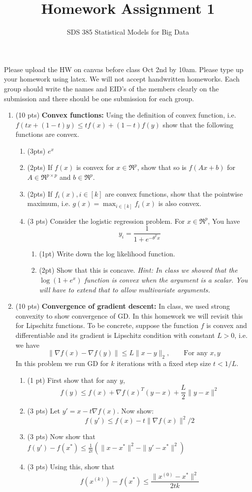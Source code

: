 \documentclass[11pt]{article}
\newcommand{\bi}{\begin{enumerate}}
\newcommand{\ib}{\end{enumerate}}
\newcommand{\p}{\item}
\begin{document}
\title{{\bf Homework Assignment 1}}
\author{SDS 385 Statistical Models for Big Data}

\date{}

\maketitle{}
Please upload the HW on canvas before class Oct 2nd by 10am. Please type up your homework using latex. We will not accept handwritten homeworks. Each group should write the names and EID's of the members clearly on the submission and there should be one submission for each group. 
\begin{enumerate}%
\item (10 pts) \textbf{Convex functions: } Using the definition of convex function, i.e. $f(tx+(1-t)y)\leq tf(x)+(1-t)f(y)$ show that the following functions are convex.
\bi
\p (3pts) $e^x$
\p (2pts) If $f(x)$ is convex for $x\in\Re^p$, show that so is $f(Ax+b)$ for $A\in \Re^{p\times p}$ and $b\in \Re^p$.
\p (2pts) If $f_i(x),i\in[k]$ are convex functions, show that the pointwise maximum, i.e. $g(x)=\max_{i\in[k]}f_i(x)$ is also convex.
\p (3 pts) Consider the logistic regression problem. For $x\in \Re^p$, You have
$$y_i=\frac{1}{1+e^{-\theta^T x}}$$

\bi
\p (1pt) Write down the log likelihood function.
\p (2pt) Show that this is concave.
\textit{Hint: In class we showed that the $\log(1+e^x)$ function is convex when the argument is a scalar. You will have to extend that to allow multivariate arguments.}
\ib

\ib
\item (10 pts) \textbf{Convergence of gradient descent:} In class, we used strong convexity to show convergence of GD. In this homework we will revisit this for Lipschitz functions. To be concrete, suppose the function $f$ is convex and differentiable and its gradient is Lipschitz condition with constant $L>0$, i.e. we have 
$$\|\nabla f(x)-\nabla f(y)\|\leq L\|x-y\|_2, \qquad \mbox{For any $x,y$}$$
In this problem we run GD for $k$ iterations with a fixed step size $t<1/L$.
\begin{enumerate} 
	\item (1 pt) First show that for any $y$,
	$$f(y)\leq f(x)+\nabla f(x)^T(y-x)+\frac{L}{2}\|y-x\|^2$$
	\item (3 pts) Let $y'=x-t\nabla f(x)$. Now show:
	$$f(y')\leq f(x)-t\|\nabla f(x)\|^2/2$$
	\item (3 pts) Now show that $f(y')-f(x^*)\leq \frac{1}{2t}(\|x-x^*\|^2-\|y'-x^*\|^2)$
	\item (3 pts) Using this, show that $$f(x^{(k)})-f(x^*)\leq \frac{\|x^{(0)}-x^*\|^2}{2tk}$$
\end{enumerate}


\end{enumerate}
\end{document}
